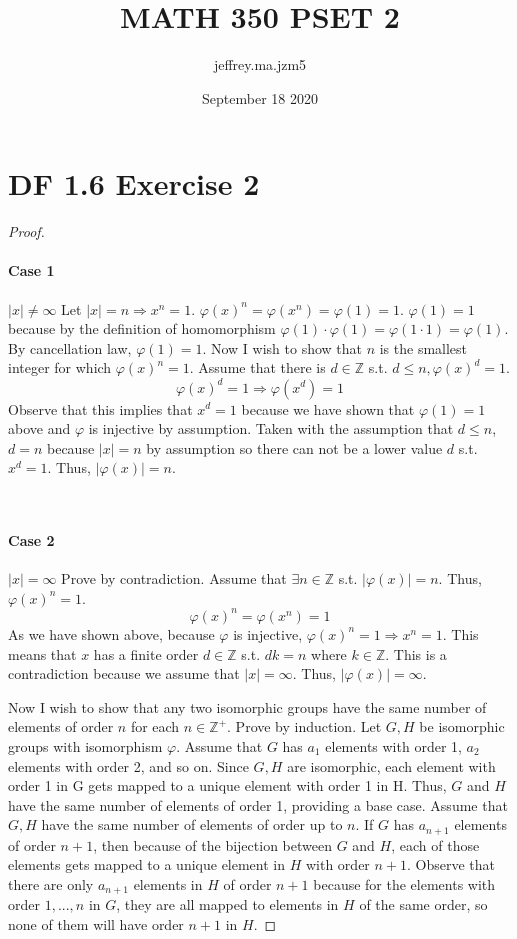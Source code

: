 \documentclass{article}
\title{MATH 350 PSET 2}
\author{jeffrey.ma.jzm5 }
\date{September 18 2020}
\begin{document}
\maketitle

\section{DF 1.6 Exercise 2}
\begin{proof}

~\paragraph{Case 1} 
$|x| \neq \infty$
\newline
\indent Let $|x|=n \Rightarrow x^n = 1$.
$\varphi(x)^n=\varphi(x^n)=\varphi(1)=1$.
$\varphi(1)=1$ because by the definition of homomorphism $\varphi(1) \cdot \varphi(1)=\varphi(1 \cdot 1) = \varphi(1)$. By cancellation law, $\varphi(1) = 1$.
\newline
\indent Now I wish to show that $n$ is the smallest integer for which $\varphi(x)^n = 1$. Assume that there is $d \in \mathbb{Z}$ s.t. $d \leq n, \varphi(x)^d = 1$.
\[
\varphi(x)^d = 1 \Rightarrow \varphi(x^d) = 1
\]
Observe that this implies that $x^d = 1$ because we have shown that $\varphi(1) = 1$ above and $\varphi$ is injective by assumption. Taken with the assumption that $d \leq n$, $d = n$ because $|x|=n$ by assumption so there can not be a lower value $d$ s.t. $x^d = 1$. Thus, $|\varphi(x)|=n$.

~\paragraph{Case 2}
$|x| = \infty$
\newline
\indent Prove by contradiction. Assume that $\exists n \in \mathbb{Z}$ s.t. $|\varphi(x)|=n$. Thus, $\varphi(x)^n=1$. 
\[
\varphi(x)^n = \varphi(x^n) = 1
\]
As we have shown above, because $\varphi$ is injective, $\varphi(x)^n=1 \Rightarrow x^n=1$. This means that $x$ has a finite order $d \in \mathbb{Z}$ s.t. $dk=n$ where $k \in \mathbb{Z}$. This is a contradiction because we assume that $|x|=\infty$. Thus, $|\varphi(x)|=\infty$.

Now I wish to show that any two isomorphic groups have the same number of elements of order $n$ for each $n \in \mathbb{Z}^+$. Prove by induction. Let $G, H$ be isomorphic groups with isomorphism $\varphi$. Assume that $G$ has $a_1$ elements with order 1, $a_2$ elements with order 2, and so on. Since $G, H$ are isomorphic, each element with order 1 in G gets mapped to a unique element with order 1 in H. Thus, $G$ and $H$ have the same number of elements of order 1, providing a base case. Assume that $G, H$ have the same number of elements of order up to $n$. If $G$ has $a_{n+1}$ elements of order $n+1$, then because of the bijection between $G$ and $H$, each of those elements gets mapped to a unique element in $H$ with order $n+1$. Observe that there are only $a_{n+1}$ elements in $H$ of order $n+1$ because for the elements with order $1,...,n$ in $G$, they are all mapped to elements in $H$ of the same order, so none of them will have order $n+1$ in $H$.


\end{proof}
\end{document}

